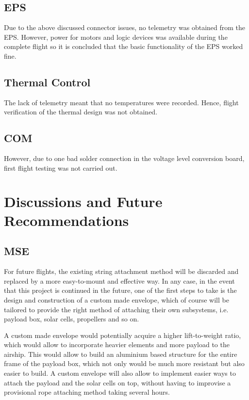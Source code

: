 \subsection{EPS}
Due to the above discussed connector issues, no telemetry was obtained from the \ac{EPS}. However, power for motors and logic devices was available during the complete flight so it is concluded that the basic functionality of the \ac{EPS} worked fine. 

\subsection{Thermal Control}
The lack of telemetry meant that no temperatures were recorded. Hence, flight verification of the thermal design was not obtained.

\subsection{COM}

However, due to one bad solder connection in the voltage level conversion board, first flight testing was not carried out.

\section{Discussions and Future Recommendations}
%
\subsection{MSE}
For future flights, the existing string attachment method will be discarded and replaced by a more easy-to-mount and effective way. In any case, in the event that this project is continued in the future, one of the first steps to take is the design and construction of a custom made envelope, which of course will be tailored to provide the right method of attaching their own subsystems, i.e. payload box, solar cells, propellers and so on. 

A custom made envelope would potentially acquire a higher lift-to-weight ratio, which would allow to incorporate heavier elements and more payload to the airship. This would  allow to build an aluminium based structure for the entire frame of the payload box, which not only would be much more resistant but also easier to build. 
A custom envelope will also allow to implement easier ways to attach the payload and the solar cells on top, without having to improvise a provisional rope attaching method taking several hours. 


